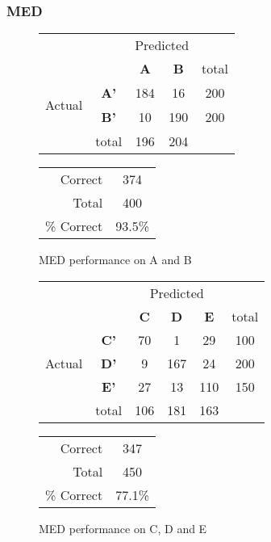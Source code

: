 \subsubsection{MED}
\begin{figure}[!ht]
\begin{minipage}[b]{0.5\linewidth}
\centering
	\begin{tabular}{ccc|c|c}
	 & &\multicolumn{2}{c}{Predicted} &\\
	  & & \bf{A} &  \bf{B} & total \\
	 \cline{3-5}
	 \multirow{2}{*}{\begin{sideways}Actual\end{sideways}} & \bf{A'}& 184 & 16 & 200 \\
	 \cline{3-5}
	 & \bf{B'}& 10 & 190 & 200 \\
	  \cline{3-5}
	 &total&196&204&\\
	\end{tabular}
\end{minipage}
\hspace{0.5cm}
\begin{minipage}[b]{0.5\linewidth}
	\begin{tabular}{r|c}
	\hline
	Correct& 374\\
	Total& 400\\
	\hline
	\% Correct& 93.5\%\\
	\hline
	\end{tabular}
\end{minipage}
\vspace{1mm}
\caption{MED performance on A and B}
\end{figure}


\begin{figure}[!ht]
\begin{minipage}[b]{0.5\linewidth}
\centering
	\begin{tabular}{ccc|c|c|c}
	 & &\multicolumn{3}{c}{Predicted} &\\
	  & & \bf{C} &  \bf{D} & \bf{E} & total \\
	 \cline{3-5}
	 \multirow{3}{*}{\begin{sideways}Actual\end{sideways}} & \bf{C'}& 70 & 1 & 29 & 100\\
	 \cline{3-6}
	 & \bf{D'}& 9 & 167 & 24 & 200\\
	  \cline{3-6}
	 & \bf{E'}& 27 & 13 & 110 &  150\\
	  \cline{3-6}
	 &total&106&181&163\\
	\end{tabular}
\end{minipage}
\hspace{0.5cm}
\begin{minipage}[b]{0.5\linewidth}
	\begin{tabular}{r|c}
	\hline
	Correct& 347\\
	Total& 450\\
	\hline
	\% Correct& 77.1\%\\
	\hline
	\end{tabular}
\end{minipage}
\vspace{1mm}
\caption{MED performance on C, D and E}
\end{figure}

